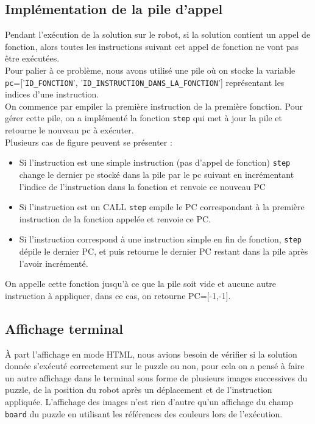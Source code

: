 \documentclass[11pt]{article}
\begin{document}
\subsection{Implémentation de la pile d'appel}
Pendant l'exécution de la solution sur le robot, si la solution contient un appel de fonction, alors toutes les instructions suivant cet appel de fonction ne vont pas être exécutées.\\
Pour palier à ce problème, nous avons utilisé une pile où on stocke la variable \texttt{pc}=['\texttt{ID\_FONCTION}',  '\texttt{ID\_INSTRUCTION\_DANS\_LA\_FONCTION}'] représentant les indices d'une instruction. \\On commence par empiler la première instruction de la première fonction. Pour gérer cette pile, on a implémenté la fonction \texttt{step} qui met à jour la pile et retourne le nouveau pc à exécuter.\\ Plusieurs cas de figure peuvent se présenter :\\
\begin{itemize}
    \item 
Si l'instruction est une simple instruction (pas d'appel de fonction) \texttt{step} change le dernier pc stocké dans la pile par le pc suivant en incrémentant l'indice de l'instruction dans la fonction et renvoie ce nouveau PC\\
\item Si l'instruction est un CALL \texttt{step} empile le PC correspondant à la première instruction de la fonction appelée et  renvoie ce PC.\\
\item  Si l'instruction correspond à une instruction simple en fin de fonction, \texttt{step} dépile le dernier PC, et puis retourne le dernier PC restant dans la pile après l'avoir incrémenté.\\
\end{itemize}
On appelle cette fonction jusqu'à ce que la pile soit vide et aucune autre instruction à appliquer, dans ce cas, on retourne PC=[-1,-1].\\
\subsection{Affichage terminal}
À part l'affichage en mode HTML, nous avions besoin de vérifier si la solution donnée s'exécuté correctement sur le puzzle ou non, pour cela on a pensé à faire un autre affichage dans le terminal sous forme de plusieurs images successives du puzzle, de la position du robot après un déplacement et de l'instruction appliquée. L'affichage des images n'est rien d'autre qu'un affichage du champ \texttt{board} du puzzle en utilisant les références des couleurs lors de l'exécution.
\end{document}
